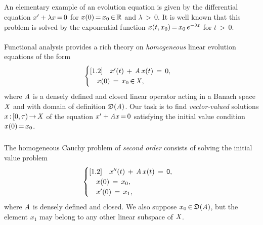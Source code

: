 \documentclass[11pt,twoside]{article}
\begin{document}
\subparagraph{} %
An elementary example of an evolution equation
is given by the differential equation
$x' + \lambda x {\,=\,} 0$ for $x(0) {\,=\,} x_0 {\,\in\,} {\mathbb{R}}$ and $\lambda {\,>\,} 0$.
It is well known that
this problem is solved by the exponential function
$x(t,x_0) {\,=\,} x_0 \, e^{-\lambda t}$ for $t {\,>\,} 0$.

\paragraph{} %
Functional analysis provides a rich theory
on \textit{homogeneous} linear evolution equations of the form
\begin{equation}\label{HOMOGENEOUS_CAUCHY_PROBLEM_I}
\begin{cases}[1.2]
\quad x'(t) \,+\, \mathit{A} \, x(t) \,=\, 0,\\ 
\quad x(0) \,=\, x_0 {\,\in\,} \mathit{X},\\
\end{cases}
\end{equation}
where $\mathit{A}$ is a densely defined and closed linear operator
acting in a Banach space $\mathit{X}$
and with domain of definition $\mathfrak{D}(\mathit{A})$.
Our task is to find \textit{vector-valued} solutions $x {\,:\,} [0,\tau) {\,\to\,} \mathit{X}$
of the equation $x' + \mathit{A} x {\,=\,} 0$ 
satisfying the initial value condition $x(0) {\,=\,} x_0$.

\subparagraph{} %
The homogeneous Cauchy problem of \textit{second order} consists of solving
the initial value problem
\begin{equation}\label{HOMOGENEOUS_CAUCHY_PROBLEM_II}
\begin{cases}[1.2]
\quad x''(t) \,+\, \mathit{A} \, x(t) \,=\, {\mathsf{0}},\\
\quad x(0)  \,=\, x_0, \\
\quad x'(0) \,=\, x_1,\\
\end{cases}
\end{equation}
where $\mathit{A}$ is densely defined and closed.
We also suppose $x_0 {\,\in\,} \mathfrak{D}(\mathit{A})$,
but the element $x_1$ may belong to any other linear subspace of $\mathit{X}$.
\end{document}
